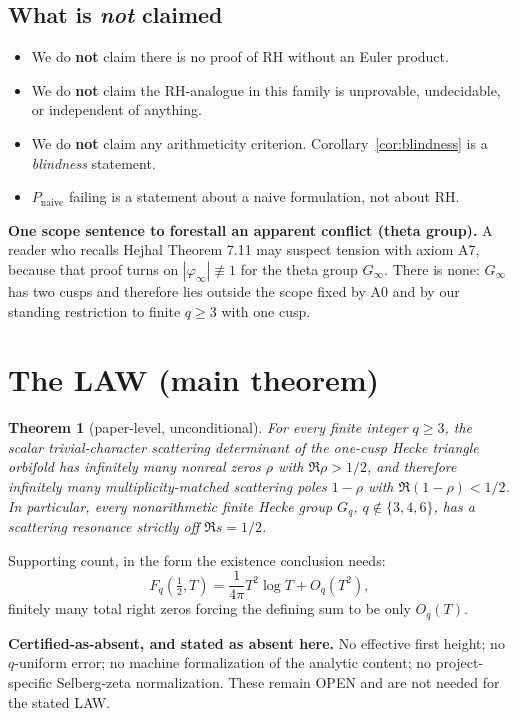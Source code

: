\documentclass[11pt]{amsart}
\newtheorem{theorem}{Theorem}[section]
\theoremstyle{remark}
\begin{document}
\subsection{What is \emph{not} claimed}

\begin{itemize}
\item We do \textbf{not} claim there is no proof of RH without an Euler
product.
\item We do \textbf{not} claim the RH-analogue in this family is
unprovable, undecidable, or independent of anything.
\item We do \textbf{not} claim any arithmeticity criterion.
Corollary~\ref{cor:blindness} is a \emph{blindness} statement.
\item $P_{\mathrm{naive}}$ failing is a statement about a naive
formulation, not about RH.
\end{itemize}

\textbf{One scope sentence to forestall an apparent conflict (theta
group).} A reader who recalls Hejhal Theorem 7.11 may suspect tension with
axiom A7, because that proof turns on $|\varphi_\infty|\not\equiv1$ for
the theta group $G_\infty$. There is none: $G_\infty$ has two cusps and
therefore lies outside the scope fixed by A0 and by our standing
restriction to finite $q\ge3$ with one cusp.

\section{The LAW (main theorem)}
\label{sec:law}

\begin{theorem}[paper-level, unconditional]
\label{thm:law}
For every finite integer $q\ge3$, the scalar trivial-character
scattering determinant of the one-cusp Hecke triangle orbifold has
infinitely many nonreal zeros $\rho$ with $\Re\rho>1/2$, and therefore
infinitely many multiplicity-matched scattering poles $1-\rho$ with
$\Re(1-\rho)<1/2$. In particular, every nonarithmetic finite Hecke group
$G_q$, $q\notin\{3,4,6\}$, has a scattering resonance strictly off
$\Re s=1/2$.
\end{theorem}

Supporting count, in the form the existence conclusion needs:
\[
F_q(\tfrac12,T)=\frac{1}{4\pi}T^2\log T+O_q(T^2),
\]
finitely many total right zeros forcing the defining sum to be only
$O_q(T)$.

\textbf{Certified-as-absent, and stated as absent here.} No effective
first height; no $q$-uniform error; no machine formalization of the
analytic content; no project-specific Selberg-zeta normalization. These
remain OPEN and are not needed for the stated LAW.
\end{document}
